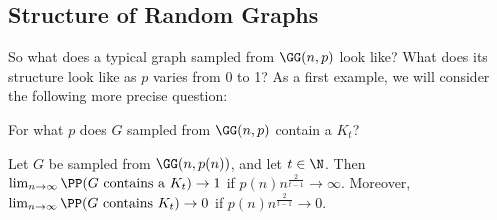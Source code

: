 \documentclass[a4paper]{scrartcl}
\begin{document}
\subsection{Structure of Random Graphs}

So what does a typical graph sampled from $\GG(n, p)$ look like? What does its structure look like as $p$ varies from 0 to 1? As a first example, we will consider the following more precise question:

\begin{center}
	For what $p$ does $G$ sampled from $\GG(n, p)$ contain a $K_t$?
\end{center}

\begin{theorem}
	Let $G$ be sampled from $\GG(n, p(n))$, and let $t \in \N$. Then
	$\lim_{n \to \infty} \PP(G \text{ contains a $K_t$}) \rightarrow 1$ if $p(n)n^{\frac{2}{t - 1}} \rightarrow \infty$.
	Moreover, $\lim_{n \to \infty} \PP(\text{$G$ contains $K_t$}) \rightarrow 0$ if $p(n) n^{\frac{2}{t - 1}} \rightarrow 0$.
\end{theorem}
\end{document}
